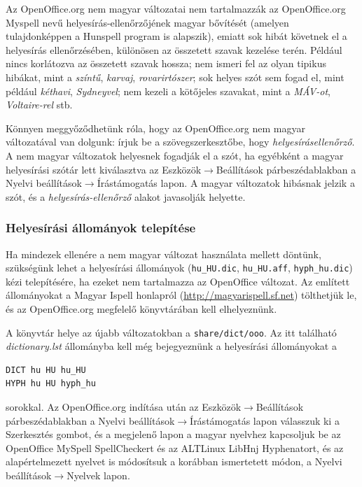 Az OpenOffice.org nem magyar változatai nem tartalmazzák
az OpenOffice.org Myspell nevű helyesírás-ellenőrzőjének
magyar bővítését (amelyen tulajdonképpen a Hunspell program is
alapszik), emiatt sok hibát követnek el a helyesírás
ellenőrzésében, különösen az összetett szavak
kezelése terén. Például nincs korlátozva az összetett
szavak hossza; nem ismeri fel az olyan tipikus hibákat,
mint a \emph{színtű}, \emph{karvaj}, \emph{rovarirtószer}; sok
helyes szót sem fogad el, mint például
\emph{kéthavi}, \emph{Sydneyvel}; nem kezeli a kötőjeles
szavakat, mint a \emph{MÁV-ot}, \emph{Voltaire-rel} stb.

Könnyen meggyőződhetünk róla, hogy az OpenOffice.org nem magyar
változatával van dolgunk: írjuk be a szövegszerkesztőbe, hogy
\emph{helyesírásellenőrző}. A nem magyar változatok helyesnek
fogadják el  a szót, ha egyébként a magyar helyesírási szótár
lett kiválasztva az Eszközök$\rightarrow$Beállítások párbeszédablakban a
Nyelvi beállítások$\rightarrow$Írástámogatás lapon. A
magyar változatok hibásnak jelzik a szót, és a
\emph{helyesírás-ellenőrző} alakot javasolják helyette.

\subsubsection{Helyesírási állományok telepítése}

Ha mindezek ellenére a nem magyar változat használata mellett döntünk,
szükségünk lehet a helyesírási állományok (\verb+hu_HU.dic+, \verb+hu_HU.aff+,
\verb+hyph_hu.dic+) kézi telepítésére, ha ezeket nem tartalmazza az OpenOffice
változat. Az említett állományokat a Magyar Ispell honlapról
(\url{http://magyarispell.sf.net}) tölthetjük le, és az OpenOffice.org
megfelelő könyvtárában kell elhelyeznünk.

A könyvtár helye az újabb változatokban a \texttt{share/dict/ooo}.
Az itt található \emph{dictionary.lst} állományba kell még bejegyeznünk
a helyesírási állományokat a

\begin{verbatim}
DICT hu HU hu_HU
HYPH hu HU hyph_hu
\end{verbatim}

sorokkal. Az OpenOffice.org indítása után az
Eszközök$\rightarrow$Beállítások párbeszédablakban a
Nyelvi beállítások$\rightarrow$Írástámogatás lapon válasszuk ki a Szerkesztés
gombot, és a megjelenő lapon a magyar nyelvhez kapcsoljuk be az
OpenOffice MySpell SpellCheckert és az ALTLinux LibHnj Hyphenatort,
és az alapértelmezett nyelvet is módosítsuk a korábban ismertetett
módon, a Nyelvi beállítások$\rightarrow$Nyelvek lapon.

